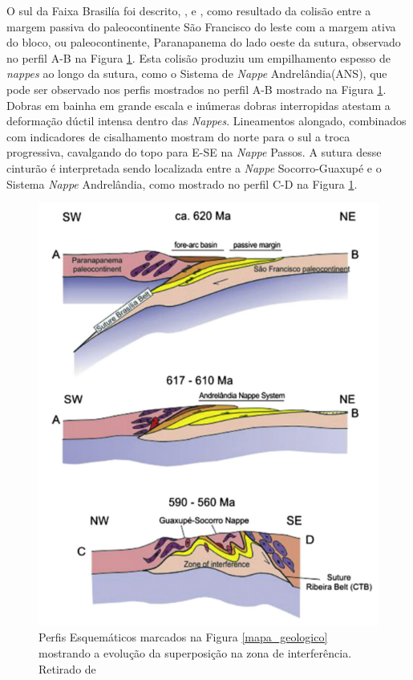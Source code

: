 O sul da Faixa Brasilía foi descrito, \cite{pimentel_tectonic_2011},\cite{reno_situ_2012} e \cite{trouw_new_2013}, como resultado da colisão entre a margem passiva do paleocontinente São Francisco do leste com a margem ativa do bloco, ou paleocontinente, Paranapanema do lado oeste da sutura, observado no perfil A-B na Figura \ref{perfil_esquematico}. Esta colisão produziu um empilhamento espesso de \textit{nappes} ao longo da sutura, como o Sistema de \textit{Nappe} Andrelândia(ANS), que pode ser observado nos perfis mostrados no perfil A-B mostrado na Figura \ref{perfil_esquematico}. Dobras em bainha em grande escala e inúmeras dobras interropidas atestam a deformação dúctil intensa dentro das \textit{Nappes}. Lineamentos alongado, combinados com indicadores de cisalhamento mostram do norte para o sul a troca progressiva, cavalgando do topo para E-SE  na \textit{Nappe} Passos. A sutura desse cinturão é interpretada sendo localizada entre a \textit{Nappe} Socorro-Guaxupé e o Sistema \textit{Nappe} Andrelândia, como mostrado no perfil C-D na Figura \ref{perfil_esquematico}.

\begin{figure}[!ht]
\centering
\includegraphics[scale=0.7]{Figs/perfil_esquematico_area.png}
\caption[Perfis Esquemáticos da Região do Sudeste do Brasil segundo  \cite{trouw_new_2013}.]{Perfis Esquemáticos marcados na Figura \ref{mapa_geologico} mostrando a evolução da superposição na zona de interferência. Retirado de \cite{trouw_new_2013}}
\label{perfil_esquematico}
\end{figure} 

